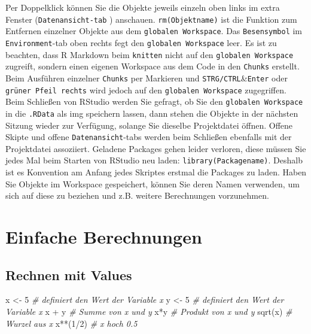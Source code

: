 \documentclass[
]{book}
\newenvironment{Shaded}{\begin{snugshade}}{\end{snugshade}}
\newcommand{\CommentTok}[1]{\textcolor[rgb]{0.56,0.35,0.01}{\textit{#1}}}
\newcommand{\DecValTok}[1]{\textcolor[rgb]{0.00,0.00,0.81}{#1}}
\newcommand{\FunctionTok}[1]{\textcolor[rgb]{0.00,0.00,0.00}{#1}}
\newcommand{\NormalTok}[1]{#1}
\newcommand{\OtherTok}[1]{\textcolor[rgb]{0.56,0.35,0.01}{#1}}
\newcommand{\SpecialCharTok}[1]{\textcolor[rgb]{0.00,0.00,0.00}{#1}}
\theoremstyle{definition}
\theoremstyle{definition}
\theoremstyle{definition}
\theoremstyle{definition}
\theoremstyle{remark}
\begin{document}
Per Doppelklick können Sie die Objekte jeweils einzeln oben links im extra Fenster (\texttt{Datenansicht-tab} ) anschauen. \texttt{rm(Objektname)} ist die Funktion zum Entfernen einzelner Objekte aus dem \texttt{globalen\ Workspace}. Das \texttt{Besensymbol} im \texttt{Environment}-tab oben rechts fegt den \texttt{globalen\ Workspace} leer. Es ist zu beachten, dass R Markdown beim \texttt{knitten} nicht auf den \texttt{globalen\ Workspace} zugreift, sondern einen eigenen Workspace aus dem Code in den \texttt{Chunks} erstellt. Beim Ausführen
einzelner \texttt{Chunks} per Markieren und \texttt{STRG/CTRL}\&\texttt{Enter} oder \texttt{grüner\ Pfeil\ rechts} wird jedoch auf den \texttt{globalen\ Workspace}
zugegriffen. Beim Schließen von RStudio werden Sie gefragt, ob Sie den \texttt{globalen\ Workspace} in die \texttt{.RData} als img speichern lassen, dann stehen die Objekte in der nächsten Sitzung wieder zur Verfügung, solange Sie dieselbe Projektdatei öffnen. Offene Skipte und offene \texttt{Datenansicht}-tabs werden beim Schließen ebenfalls mit der Projektdatei assoziiert. Geladene Packages gehen leider verloren, diese müssen Sie jedes Mal beim Starten von RStudio neu laden: \texttt{library(Packagename)}. Deshalb ist es Konvention am Anfang jedes Skriptes erstmal die Packages zu laden. Haben Sie Objekte im Workspace gespeichert, können Sie deren
Namen verwenden, um sich auf diese zu beziehen und z.B. weitere Berechnungen vorzunehmen.

\hypertarget{einfache-berechnungen}{%
\section{Einfache Berechnungen}\label{einfache-berechnungen}}

\hypertarget{rechnen-mit-values}{%
\subsection{Rechnen mit Values}\label{rechnen-mit-values}}

\begin{Shaded}
\begin{Highlighting}[]
\NormalTok{x }\OtherTok{\textless{}{-}} \DecValTok{5}       \CommentTok{\# definiert den Wert der Variable x}
\NormalTok{y }\OtherTok{\textless{}{-}} \DecValTok{5}       \CommentTok{\# definiert den Wert der Variable x}
\NormalTok{x }\SpecialCharTok{+}\NormalTok{ y        }\CommentTok{\# Summe von x und y}
\NormalTok{x}\SpecialCharTok{*}\NormalTok{y          }\CommentTok{\# Produkt von x und y }
\FunctionTok{sqrt}\NormalTok{(x)      }\CommentTok{\# Wurzel aus x}
\NormalTok{x}\SpecialCharTok{**}\NormalTok{(}\DecValTok{1}\SpecialCharTok{/}\DecValTok{2}\NormalTok{)     }\CommentTok{\# x hoch 0.5}
\end{Highlighting}
\end{Shaded}
\end{document}
